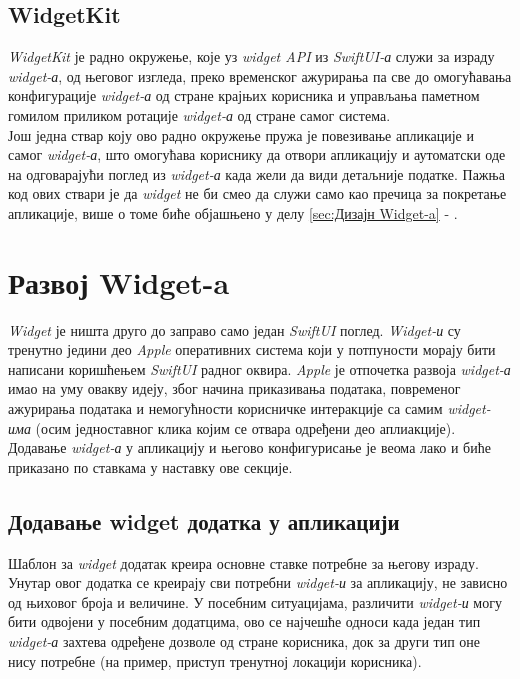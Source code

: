 \documentclass[12pt,oneside]{memoir}
\begin{document}
\subsection{WidgetKit}
\indent \textit{WidgetKit} је радно окружење, које уз \textit{widget API} из  \textit{SwiftUI-а} служи за израду \textit{widget-а}, од његовог изгледа, преко временског ажурирања па све до омогућавања конфигурације \textit{widget-а} од стране крајњих корисника и управљања паметном гомилом приликом ротације \textit{widget-а} од стране самог система. 
\\
\indent Још једна ствар коју ово радно окружење пружа је повезивање апликације и самог \textit{widget-а}, што омогућава кориснику да отвори апликацију и аутоматски оде на одговарајући поглед из \textit{widget-а} када жели да види детаљније податке. Пажња код ових ствари је да \textit{widget} не би смео да служи само као пречица за покретање апликације, више о томе биће објашњено у делу \ref{sec:Дизајн Widget-a} - .


\section{Развој Widget-a}
\label{sec:Развој Widget-a}
\indent \textit{Widget} је ништа друго до заправо само један \textit{SwiftUI} поглед. \textit{Widget-и} су тренутно једини део \textit{Apple} оперативних система који у потпуности морају бити написани коришћењем \textit{SwiftUI} радног оквира. \textit{Apple} је отпочетка развоја \textit{widget-а} имао на уму овакву идеју, због начина приказивања података, повременог ажурирања података и немогућности корисничке интеракције са самим \textit{widget-има} (осим једноставног клика којим се отвара одређени део аплиакције).  
\\
\indent Додавање \textit{widget-а} у апликацију и његово конфигурисање је веома лако и биће приказано по ставкама у наставку ове секције. 

\subsection{Додавање widget додатка у апликацији}
\indent Шаблон за \textit{widget} додатак креира основне ставке потребне за његову израду. Унутар овог додатка се креирају сви потребни \textit{widget-и} за апликацију, не зависно од њиховог броја и величине. У посебним ситуацијама, различити \textit{widget-и} могу бити одвојени у посебним додатцима, ово се најчешће односи када један тип \textit{widget-а} захтева одређене дозволе од стране корисника, док за други тип оне нису потребне (на пример, приступ тренутној локацији корисника).
\end{document}
